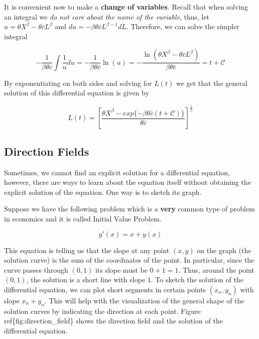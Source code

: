 \documentclass[11pt]{article}
\begin{document}
It is convenient now to make a \textbf{change of variables}. Recall that
when solving an integral we \emph{do not care about the name of the
variable}, thus, let \(u = \theta X^{\beta} - \theta\bar{c}L^{\beta}\)
and \(du = -\beta\theta\bar{c}L^{\beta-1}dL\). Therefore, we can solve
the simpler integral

\[
-\frac{1}{\beta\theta\bar{c}}\int\frac{1}{u} du = -\frac{1}{\beta\theta\bar{c}}\ln(u) = -\frac{\ln\left(\theta X^{\beta} -\theta\bar{c}L^{\beta}\right)}{\beta\theta\bar{c}} = t+\mathcal{C}
\]

By exponentiating on both sides and solving for \(L(t)\) we get that the
general solution of this differential equation is given by

\[
L(t) = \left[\frac{\theta X^{\beta} - exp\{-\beta\theta\bar{c}(t+\mathcal{C})\}}{\theta\bar{c}}\right]^{\frac{1}{\beta}}
\]

    \hypertarget{direction-fields}{%
\subsection{Direction Fields}\label{direction-fields}}

Sometimes, we cannot find an explicit solution for a differential
equation, however, there are ways to learn about the equation itself
without obtaining the explicit solution of the equation. One way is to
sketch its graph.

Suppose we have the following problem which is a \textbf{very} common
type of problem in economics and it is called Initial Value Problem.

\[
y'(x) = x + y(x)
\]

This equation is telling us that the slope at any point \((x,y)\) on the
graph (the solution curve) is the sum of the coordinates of the point.
In particular, since the curve passes through \((0,1)\) its slope must
be \(0 + 1 = 1\). Thus, around the point \((0,1)\), the solution is a
short line with slope \(1\). To sketch the solution of the differential
equation, we can plot short segments in certain points \((x_n,y_n)\)
with slope \(x_n + y_n\). This will help with the visualization of the
general shape of the solution curves by indicating the direction at each
point. Figure ref\{fig:direction\_field\} shows the direction field and
the solution of the differential equation.

    \begin{center}
    \end{center}
    { \hspace*{\fill} \\}
    
\end{document}
